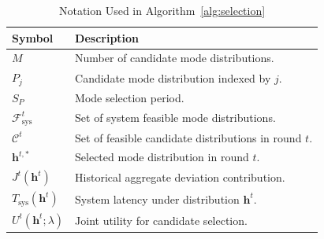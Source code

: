 \documentclass[5p,times]{elsarticle}
\theoremstyle{plain}
\theoremstyle{definition}
\theoremstyle{remark}
\begin{document}
	\begin{table}[t]
		\centering
		\caption{Notation Used in Algorithm~\ref{alg:selection}}
		\label{tab:algorithm_notation}
		\small
		\setlength{\tabcolsep}{4pt}
		\begin{tabular}{p{}p{}}
			\hline
			\textbf{Symbol} & \textbf{Description} \\
			\hline
			$M$ & Number of candidate mode distributions. \\
			$P_j$ & Candidate mode distribution indexed by $j$. \\
			$S_P$ & Mode selection period. \\
			$\mathcal F_{\mathrm{sys}}^t$ &
			Set of system feasible mode distributions. \\
			$\mathcal C^t$ &
			Set of feasible candidate distributions in round $t$. \\
			$\mathbf h^{t,\ast}$ &
			Selected mode distribution in round $t$. \\
			$J^t(\mathbf h^t)$ &
			Historical aggregate deviation contribution. \\
			$T_{\mathrm{sys}}(\mathbf h^t)$ &
			System latency under distribution $\mathbf h^t$. \\
			$U^t(\mathbf h^t;\lambda)$ &
			Joint utility for candidate selection. \\
			\hline
		\end{tabular}
	\end{table}
	
\end{document}
